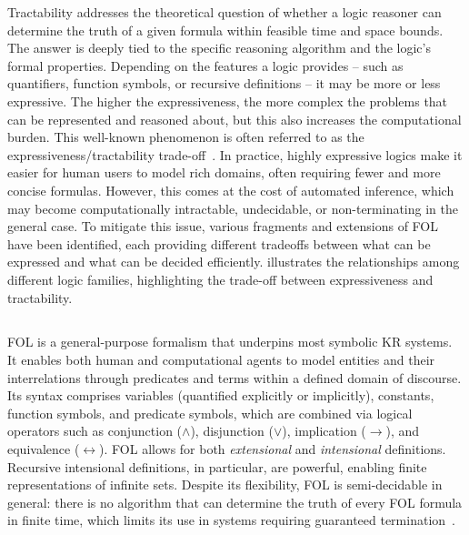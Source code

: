 %
Tractability addresses the theoretical question of whether a logic reasoner can determine the truth of a given formula within feasible time and space bounds.
%
The answer is deeply tied to the specific reasoning algorithm and the logic's formal properties.
%
Depending on the features a logic provides -- such as quantifiers, function symbols, or recursive definitions -- it may be more or less expressive.
%
The higher the expressiveness, the more complex the problems that can be represented and reasoned about, but this also increases the computational burden.
%
This well-known phenomenon is often referred to as the expressiveness/tractability trade-off~\cite{DBLP:journals/jlp/CadoliS93,BRACHMAN2004327,DBLP:journals/ci/LevesqueB87}.
%
In practice, highly expressive logics make it easier for human users to model rich domains, often requiring fewer and more concise formulas.
%
However, this comes at the cost of automated inference, which may become computationally intractable, undecidable, or non-terminating in the general case.
%
To mitigate this issue, various fragments and extensions of \gls{FOL} have been identified, each providing different tradeoffs between what can be expressed and what can be decided efficiently.
%
 illustrates the relationships among different logic families, highlighting the trade-off between expressiveness and tractability.


\subsection{}\label{subsec:first-order-logic}
%
\Gls{FOL} is a general-purpose formalism that underpins most symbolic \gls{KR} systems.
%
It enables both human and computational agents to model entities and their interrelations through predicates and terms within a defined domain of discourse.
%
Its syntax comprises variables (quantified explicitly or implicitly), constants, function symbols, and predicate symbols, which are combined via logical operators such as conjunction (\(\wedge\)), disjunction (\(\vee\)), implication (\(\rightarrow\)), and equivalence (\(\leftrightarrow\)).
%
\Gls{FOL} allows for both \emph{extensional} and \emph{intensional} definitions.
%
Recursive intensional definitions, in particular, are powerful, enabling finite representations of infinite sets.
%
Despite its flexibility, \gls{FOL} is semi-decidable in general: there is no algorithm that can determine the truth of every \gls{FOL} formula in finite time, which limits its use in systems requiring guaranteed termination~\cite{DBLP:conf/dlog/2003handbook}.


